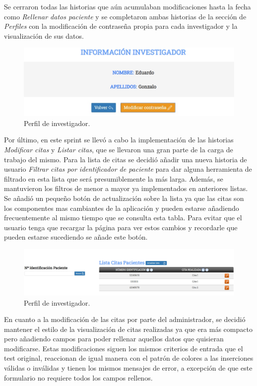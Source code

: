 Se cerraron todas las historias que aún acumulaban modificaciones hasta la fecha como \textit{Rellenar datos paciente} y se completaron ambas historias de la sección de \textit{Perfiles} con la modificación de contraseña propia para cada investigador y la visualización de sus datos.

\begin{figure}[h]
    \centering
     \includegraphics[width=14.cm,height=4.cm]{images/perfil.jpg}
    \caption{Perfil de investigador.}
\end{figure}
\newpage

Por último, en este sprint se llevó a cabo la implementación de las historias \textit{Modificar citas} y \textit{Listar citas}, que se llevaron una gran parte de la carga de trabajo del mismo. Para la lista de citas se decidió añadir una nueva historia de usuario \textit{Filtrar citas por identificador de paciente} para dar alguna herramienta de filtrado en esta lista que será presumiblemente la más larga. Además, se mantuvieron los filtros de menor a mayor ya implementados en anteriores listas. Se añadió un pequeño botón de actualización sobre la lista ya que las citas son los componentes mas cambiantes de la aplicación y pueden estarse añadiendo frecuentemente al mismo tiempo que se consulta esta tabla. Para evitar que el usuario tenga que recargar la página para ver estos cambios y recordarle que pueden estarse sucediendo se añade este botón.

\begin{figure}[h]
    \centering
     \includegraphics[width=1\textwidth]{images/listarCitas.jpg}
    \caption{Perfil de investigador.}
\end{figure}

En cuanto a la modificación de las citas por parte del administrador, se decidió mantener el estilo de la visualización de citas realizadas ya que era más compacto pero añadiendo campos para poder rellenar aquellos datos que quisieran modificarse. Estas modificaciones siguen los mismos criterios de entrada que el test original, reaccionan de igual manera con el patrón de colores a las inserciones válidas o inválidas y tienen los mismos mensajes de error, a excepción de que este formulario no requiere todos los campos rellenos.

